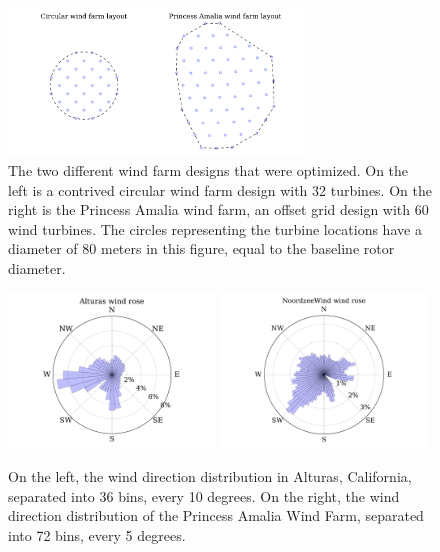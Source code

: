 \documentclass[WESD, manuscript]{copernicus}
\begin{document}
\begin{figure}[htbp]
  \centering
   \includegraphics[trim={0 0.5cm 0 0.4cm},clip,width=0.7\textwidth]{Figures/baseline_layouts.pdf}
  \caption{\label{layouts} The two different wind farm designs that were optimized. On the left is a contrived circular wind farm design with 32 turbines. On the right is the Princess Amalia wind farm, an offset grid design with 60 wind turbines. The circles representing the turbine locations have a diameter of 80 meters in this figure, equal to the baseline rotor diameter.}
\end{figure}
%
\begin{figure}[htbp]
  \centering
  \includegraphics[width=0.49\textwidth]{Figures/alturas_rose.pdf}
  \includegraphics[width=0.49\textwidth]{Figures/NZW_rose.pdf}
  \caption{\label{wind_roses} On the left, the wind direction distribution in Alturas, California, separated into 36 bins, every 10 degrees. On the right, the wind direction distribution of the Princess Amalia Wind Farm, separated into 72 bins, every 5 degrees.}
\end{figure}
\end{document}
